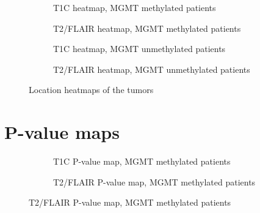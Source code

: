 \begin{subappendices}
\begin{figure}[H]
        \begin{subfigure}[t]{0.4\textwidth}
            \centering
            \caption{\gls{T1C} heatmap, \gls{MGMT} methylated patients}\label{fig:HGG_loc_T1_heatmap_methylated}
        \end{subfigure}
        \begin{subfigure}[t]{0.4\textwidth}
            \centering
            \caption{\gls{T2}/\gls{FLAIR} heatmap, \gls{MGMT} methylated patients}\label{fig:HGG_loc_T2_heatmap_methylated}
        \end{subfigure}

        \begin{subfigure}[t]{0.4\textwidth}
            \centering
            \caption{\gls{T1C} heatmap, \gls{MGMT} unmethylated patients}\label{fig:HGG_loc_T1_heatmap_unmethylated}
        \end{subfigure}
        \begin{subfigure}[t]{0.4\textwidth}
            \centering
            \caption{\gls{T2}/\gls{FLAIR} heatmap, \gls{MGMT} unmethylated patients}\label{fig:HGG_loc_T2_heatmap_unmethylated}
        \end{subfigure}

        \caption{Location heatmaps of the \glspl{tumor}}
    \end{figure}

    \newpage
    \section{P-value maps}
    \begin{figure}[H]
        \centering
        \begin{subfigure}[t]{0.4\textwidth}
            \centering
            \caption{\gls{T1C} P-value map, \gls{MGMT} methylated patients}\label{fig:HGG_loc_T1_p_value_map_methylated}
        \end{subfigure}
        \begin{subfigure}[t]{0.4\textwidth}
            \centering
            \caption{\gls{T2}/\gls{FLAIR} P-value map, \gls{MGMT} methylated patients}\label{fig:HGG_loc_T2_p_value_map_methylated}
        \end{subfigure}


\end{figure}
\end{subappendices}
